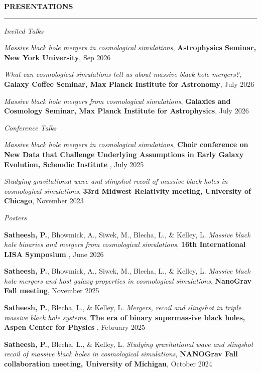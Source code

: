 \documentclass{resume} %
\renewenvironment{rSection}[1]{
\sectionskip
\textbf{\textcolor{C2}{\MakeUppercase{#1}}}
\sectionlineskip
\hrule
\begin{list}{}{
\setlength{\leftmargin}{1.5em}
}
\item[]
}{
\end{list}
}
\newcommand{\conference}[1]{\textcolor{C2}{\textbf{#1}}}
\begin{document}
\begin{rSection}{Presentations}
    \begin{rSubsection}{\textit{Invited Talks}}{}{}{}
        \item \emph{Massive black hole mergers in cosmological simulations}, \conference{Astrophysics Seminar, New York University}, Sep 2026
        \item \emph{What can cosmological simulations tell us about massive black hole mergers?}, \conference{Galaxy Coffee Seminar, Max Planck Institute for Astronomy}, July 2026
        \item \emph{Massive black hole mergers from cosmological simulations}, \conference{Galaxies and Cosmology Seminar, Max Planck Institute for Astrophysics}, July 2026 
    \end{rSubsection}
    \begin{rSubsection}{\textit{Conference Talks}}{}{}{}
        \item \emph{Massive black hole mergers in cosmological simulations}, \conference{Choir conference on New Data that Challenge Underlying Assumptions in Early Galaxy Evolution, Schoodic Institute }, July 2025
        \item \emph{Studying gravitational wave and slingshot recoil of massive black holes in cosmological simulations}, \conference{33rd Midwest Relativity meeting, University of Chicago}, November 2023 
    \end{rSubsection}
    \begin{rSubsection}{\textit{Posters}}{}{}{}
        \item \textbf{Satheesh, P.}, Bhowmick, A., Siwek, M., Blecha, L., \& Kelley, L. \emph{Massive black hole binaries and mergers from cosmological simulations}, \conference{16th International LISA Symposium} , June 2026
        \item \textbf{Satheesh, P.}, Bhowmick, A., Siwek, M., Blecha, L., \& Kelley, L. \emph{Massive black hole mergers and host galaxy properties in cosmological simulations}, \conference{NanoGrav Fall meeting}, November 2025
        \item \textbf{Satheesh, P.}, Blecha, L., \& Kelley, L. \emph{Mergers, recoil and slingshot in triple massive black hole systems}, \conference{The era of binary supermassive black holes, Aspen Center for Physics} , February 2025
        \item \textbf{Satheesh, P.}, Blecha, L., \& Kelley, L. \emph{Studying gravitational wave and slingshot recoil of massive black holes in cosmological simulations}, \conference{NANOGrav Fall collaboration meeting, University of Michigan}, October 2024

\end{rSubsection}
\end{rSection}
\end{document}
